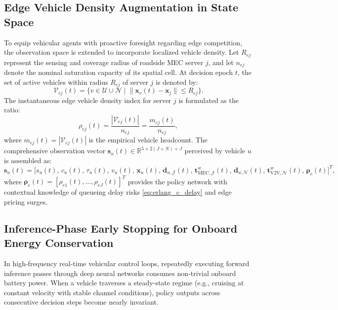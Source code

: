 \documentclass[12pt,a4paper]{article}
\begin{document}
\subsection{Edge Vehicle Density Augmentation in State Space}
\label{subsec:edge_density}
To equip vehicular agents with proactive foresight regarding edge competition, the observation space is extended to incorporate localized vehicle density. Let $R_{ej}$ represent the sensing and coverage radius of roadside MEC server $j$, and let $n_{ej}$ denote the nominal saturation capacity of its spatial cell. At decision epoch $t$, the set of active vehicles within radius $R_{ej}$ of server $j$ is denoted by:
\begin{equation}
\mathcal{V}_{ej}(t) = \big\{ v \in \mathcal{U} \cup \mathcal{N} \;\big|\; \|\mathbf{x}_v(t) - \mathbf{x}_j\| \le R_{ej} \big\}.
\label{eq:coverage_set}
\end{equation}
The instantaneous edge vehicle density index for server $j$ is formulated as the ratio:
\begin{equation}
\rho_{ej}(t) = \frac{|\mathcal{V}_{ej}(t)|}{n_{ej}} = \frac{m_{ej}(t)}{n_{ej}},
\label{eq:edge_density}
\end{equation}
where $m_{ej}(t) = |\mathcal{V}_{ej}(t)|$ is the empirical vehicle headcount. The comprehensive observation vector $\mathbf{s}_u(t) \in \mathbb{R}^{5 + 2(J+N) + J}$ perceived by vehicle $u$ is assembled as:
\begin{equation}
\mathbf{s}_u(t) = \Big[ s_u(t),\, c_u(t),\, \tau_u(t),\, v_u(t),\, \mathbf{x}_u(t),\, \mathbf{d}_{u,\mathcal{J}}(t),\, \mathbf{t}_{\mathrm{MEC},\mathcal{J}}^w(t),\, \mathbf{d}_{u,\mathcal{N}}(t),\, \mathbf{t}_{\mathrm{V2V},\mathcal{N}}^w(t),\, \boldsymbol{\rho}_e(t) \Big]^T,
\label{eq:augmented_state}
\end{equation}
where $\boldsymbol{\rho}_e(t) = [\rho_{e1}(t), \dots, \rho_{eJ}(t)]^T$ provides the policy network with contextual knowledge of queueing delay risks \eqref{eq:erlang_c_delay} and edge pricing surges.

\subsection{Inference-Phase Early Stopping for Onboard Energy Conservation}
\label{subsec:early_stopping}
In high-frequency real-time vehicular control loops, repeatedly executing forward inference passes through deep neural networks consumes non-trivial onboard battery power. When a vehicle traverses a steady-state regime (e.g., cruising at constant velocity with stable channel conditions), policy outputs across consecutive decision steps become nearly invariant. 
\end{document}
